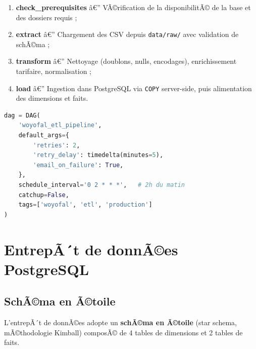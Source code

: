 \documentclass[12pt,a4paper]{report}
\begin{document}
\begin{enumerate}
  \item \textbf{check\_prerequisites} â€” VÃ©rification de la disponibilitÃ© de la base et des dossiers requis ;
  \item \textbf{extract} â€” Chargement des CSV depuis \texttt{data/raw/} avec validation de schÃ©ma ;
  \item \textbf{transform} â€” Nettoyage (doublons, nulls, encodages), enrichissement tarifaire, normalisation ;
  \item \textbf{load} â€” Ingestion dans PostgreSQL via \texttt{COPY} server-side, puis alimentation des dimensions et faits.
\end{enumerate}

\begin{codebox}
\begin{lstlisting}[language=Python, numbers=none]
dag = DAG(
    'woyofal_etl_pipeline',
    default_args={
        'retries': 2,
        'retry_delay': timedelta(minutes=5),
        'email_on_failure': True,
    },
    schedule_interval='0 2 * * *',   # 2h du matin
    catchup=False,
    tags=['woyofal', 'etl', 'production']
)
\end{lstlisting}
\end{codebox}

\section{EntrepÃ´t de donnÃ©es PostgreSQL}

\subsection{SchÃ©ma en Ã©toile}

L'entrepÃ´t de donnÃ©es adopte un \textbf{schÃ©ma en Ã©toile} (star schema, mÃ©thodologie Kimball) composÃ© de 4 tables de dimensions et 2 tables de faits.
\end{document}
